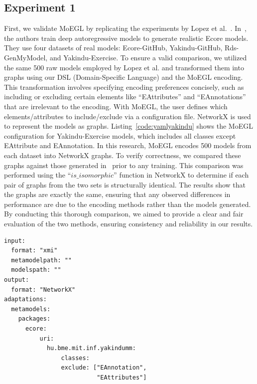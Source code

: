 \documentclass[journal,article,submit,moreauthors,technologies]{Definitions/mdpi}
\begin{document}
\subsection{Experiment 1}
First, we validate MoEGL by replicating the experiments by Lopez et al.~\cite{lopez2022generating}. In~\cite{lopez2022generating}, the authors train deep autoregressive models to generate realistic Ecore models. They use four datasets of real models: Ecore-GitHub, Yakindu-GitHub, Rds-GenMyModel, and Yakindu-Exercise.
To ensure a valid comparison, we utilized the same 500 raw models employed by Lopez et al. and transformed them into graphs using our DSL (Domain-Specific Language) and the MoEGL encoding. This transformation involves specifying encoding preferences concisely, such as including or excluding certain elements like ``EAttributes'' and ``EAnnotations'' that are irrelevant to the encoding.
With MoEGL, the user defines which elements/attributes to include/exclude via a configuration file. NetworkX is used to represent the models as graphs. Listing~\ref{code:yamlyakindu} shows the MoEGL configuration for Yakindu-Exercise models, which includes all classes except EAttribute and EAnnotation.
In this research, MoEGL encodes 500 models from each dataset into NetworkX graphs. To verify correctness, we compared these graphs against those generated in~\cite{lopez2022generating} prior to any training. This comparison was performed using the ``$is\_isomorphic$'' function in NetworkX to determine if each pair of graphs from the two sets is structurally identical. The results show that the graphs are exactly the same, ensuring that any observed differences in performance are due to the encoding methods rather than the models generated.
By conducting this thorough comparison, we aimed to provide a clear and fair evaluation of the two methods, ensuring consistency and reliability in our results.


\begin{program_}[H]
\footnotesize
\begin{verbatim}
input:
  format: "xmi"
  metamodelpath: ""
  modelspath: ""
output:
  format: "NetworkX"
adaptations:
  metamodels:
    packages:
      ecore:
          uri:
            hu.bme.mit.inf.yakindumm:
                classes:
                exclude: ["EAnnotation",
                          "EAttributes"]
\end{verbatim}
\caption{The MoEGL configuration provided to customize encoding the Yakindu-Exercise models.}
\label{code:yamlyakindu}
\end{program_}
\end{document}
